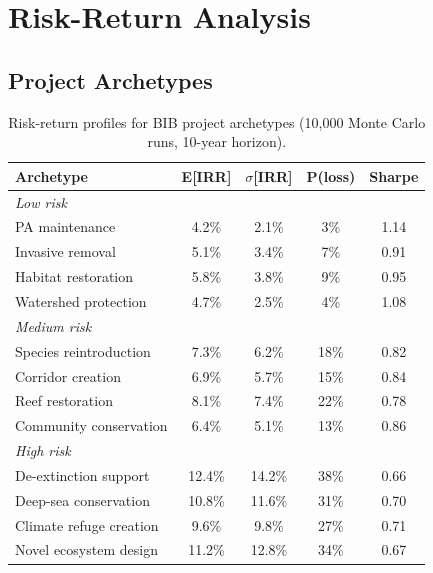\documentclass[11pt,a4paper]{article}
\begin{document}
\section{Risk-Return Analysis}
\label{sec:analysis}

\subsection{Project Archetypes}

\begin{table}[H]
\centering
\caption{Risk-return profiles for BIB project archetypes (10{,}000 Monte
Carlo runs, 10-year horizon).}
\label{tab:riskreturn}
\begin{tabular}{lcccc}
\toprule
\textbf{Archetype} & \textbf{E[IRR]} & \textbf{$\sigma$[IRR]} &
  \textbf{P(loss)} & \textbf{Sharpe} \\
\midrule
\multicolumn{5}{l}{\emph{Low risk}} \\
\quad PA maintenance & 4.2\% & 2.1\% & 3\% & 1.14 \\
\quad Invasive removal & 5.1\% & 3.4\% & 7\% & 0.91 \\
\quad Habitat restoration & 5.8\% & 3.8\% & 9\% & 0.95 \\
\quad Watershed protection & 4.7\% & 2.5\% & 4\% & 1.08 \\
\midrule
\multicolumn{5}{l}{\emph{Medium risk}} \\
\quad Species reintroduction & 7.3\% & 6.2\% & 18\% & 0.82 \\
\quad Corridor creation & 6.9\% & 5.7\% & 15\% & 0.84 \\
\quad Reef restoration & 8.1\% & 7.4\% & 22\% & 0.78 \\
\quad Community conservation & 6.4\% & 5.1\% & 13\% & 0.86 \\
\midrule
\multicolumn{5}{l}{\emph{High risk}} \\
\quad De-extinction support & 12.4\% & 14.2\% & 38\% & 0.66 \\
\quad Deep-sea conservation & 10.8\% & 11.6\% & 31\% & 0.70 \\
\quad Climate refuge creation & 9.6\% & 9.8\% & 27\% & 0.71 \\
\quad Novel ecosystem design & 11.2\% & 12.8\% & 34\% & 0.67 \\
\bottomrule
\end{tabular}
\end{table}
\end{document}
